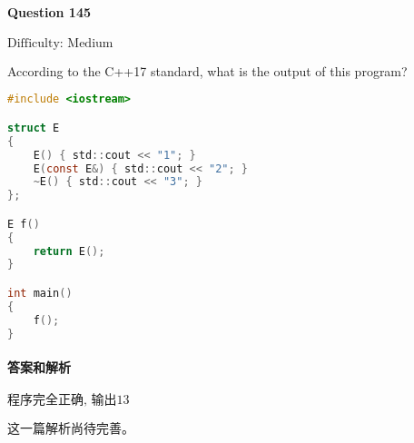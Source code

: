 \documentclass{article}
\begin{document}
	\paragraph*{Question 145} $\boxed{\text{Difficulty: Medium}} $	
	
	According to the C++17 standard, what is the output of this program?	
	
	\begin{lstlisting}[language=C]
#include <iostream>

struct E
{
	E() { std::cout << "1"; }
	E(const E&) { std::cout << "2"; }
	~E() { std::cout << "3"; }
};

E f()
{ 
	return E();
}

int main()
{
	f();
}
	\end{lstlisting}
	\paragraph*{答案和解析} $\boxed{\text{程序完全正确, 输出13}} $
	
	这一篇解析尚待完善。
\end{document}
